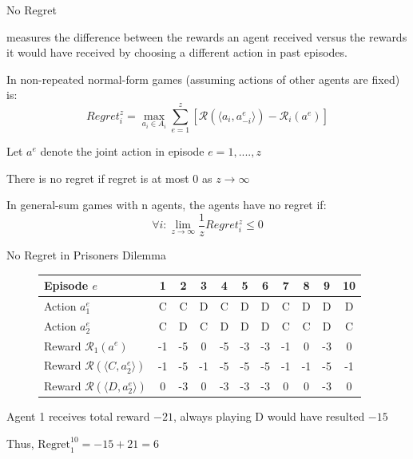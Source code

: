 \begin{frame}{No Regret}

 measures the difference between the rewards an agent received versus the rewards it would have received by choosing a different action in past episodes. 
\blist
\item In non-repeated normal-form games (assuming actions of other agents are fixed)  is:
\elist
\begin{equation*}
    Regret_i^{z} = \max_{a_i \in A_i}\sum_{e = 1}^z\left[\mathcal{R}(\langle a_i, a_{-i}^{e}\rangle) - \mathcal{R}_i (a^e) \right]
\end{equation*}

\blist
    \item Let \(a^e\) denote the joint action in episode \(e = 1, ...., z\)
    \item There is no regret if regret is at most 0 as $z \to \infty$ 
    \item  In general-sum games with n agents, the agents have no regret if:
\elist
\vspace{1pt}
 \[
 \forall i: \lim_{z \to \infty} \frac{1}{z}Regret_{i}^{z} \le 0
 \]

\end{frame}

\begin{frame}{No Regret in Prisoners Dilemma}

\begin{figure}[t]
	\centering
	\begin{tabular}{@{} l c c c c c c c c c c @{}}
		\toprule
		Episode $e$ \hspace{5em} 					  & 1 & 2 & 3 & 4 & 5 & 6 & 7 & 8 & 9 & 10 \\
		\midrule
		Action $a^e_1$  			 						 &  C &  C & D  & C  &  D  & D  &  C & D  & D & D \\
		Action $a^e_2$  			 						&  C &  D & C  & D  &  D  & D  &  C & C  & D & C \\
		Reward $\mathcal{R}_1(a^e)$						 & -1 & -5 & 0  & -5 & -3 & -3 & -1 & 0 & -3 & 0 \\
		\midrule
		Reward $\mathcal{R}(\langle C, a^e_2\rangle)$	& -1 & -5 & -1 & -5 & -5 & -5 & -1 & -1 & -5 & -1 \\
		Reward $\mathcal{R}(\langle D, a^e_2\rangle)$	&  0 & -3 & 0 & -3  & -3 & -3 & 0  & 0 & -3 & 0 \\
		\bottomrule
	\end{tabular}
 \end{figure}

 \blist
    \item Agent 1 receives total reward \(-21\), always playing D would have resulted \(-15\) 
    \item Thus, \(\text{Regret}_{1}^{10} = -15 + 21 = 6\)
 \elist
    
\end{frame}

